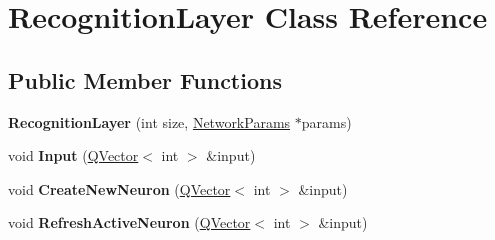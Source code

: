 \hypertarget{class_recognition_layer}{}\section{Recognition\+Layer Class Reference}
\label{class_recognition_layer}
\subsection*{Public Member Functions}
\begin{DoxyCompactItemize}
\item 
\mbox{\label{class_recognition_layer_aeac3da57473f65476beb397fb6230d67}} 
{\bfseries Recognition\+Layer} (int size, \hyperlink{struct_a_r_t_1_1_network_params}{Network\+Params} $\ast$params)
\item 
\mbox{\label{class_recognition_layer_a0a13b30e2eace25d061274ef149fc944}} 
void {\bfseries Input} (\hyperlink{class_q_vector}{Q\+Vector}$<$ int $>$ \&input)
\item 
\mbox{\label{class_recognition_layer_a775e058d1b7f2a6d2bcdae95f7d3c567}} 
void {\bfseries Create\+New\+Neuron} (\hyperlink{class_q_vector}{Q\+Vector}$<$ int $>$ \&input)
\item 
\mbox{\label{class_recognition_layer_add15a8f3237d548fd4235843dea48efd}} 
void {\bfseries Refresh\+Active\+Neuron} (\hyperlink{class_q_vector}{Q\+Vector}$<$ int $>$ \&input)
\end{DoxyCompactItemize}
